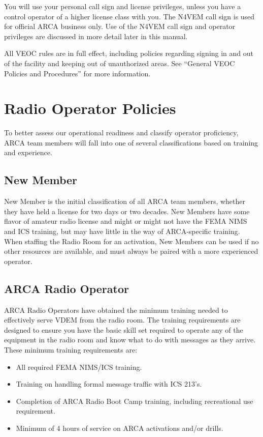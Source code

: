 \documentclass[pdflatex,letterpaper,twoside,12pt]{book}
\begin{document}
You will use your personal call sign and license privileges, unless you have a control operator of a higher license class with you.  The N4VEM call sign is used for official ARCA business only.  Use of the N4VEM call sign and operator privileges are discussed in more detail later in this manual.

All VEOC rules are in full effect, including policies regarding signing in and out of the facility and keeping out of unauthorized areas.  See ``General VEOC Policies and Procedures'' for more information.


\section{Radio Operator Policies}

To better assess our operational readiness and classify operator proficiency, ARCA team members will fall into one of several classifications based on training and experience.

\subsection{New Member}

New Member is the initial classification of all ARCA team members, whether they have held a license for two days or two decades.  New Members have some flavor of amateur radio license and might or might not have the FEMA NIMS and ICS training, but may have little in the way of ARCA-specific training.  When staffing the Radio Room for an activation, New Members can be used if no other resources are available, and must always be paired with a more experienced operator.

\subsection{ARCA Radio Operator}

ARCA Radio Operators have obtained the minimum training needed to effectively serve VDEM from the radio room.  The training requirements are designed to ensure you have the basic skill set required to operate any of the equipment in the radio room and know what to do with messages as they arrive.  These minimum training requirements are:

\begin{itemize}
	\item All required FEMA NIMS/ICS training.
	\item Training on handling formal message traffic with ICS 213's.
	\item Completion of ARCA Radio Boot Camp training, including recreational use requirement.
	\item Minimum of 4 hours of service on ARCA activations and/or drills.
\end{itemize}
\end{document}
